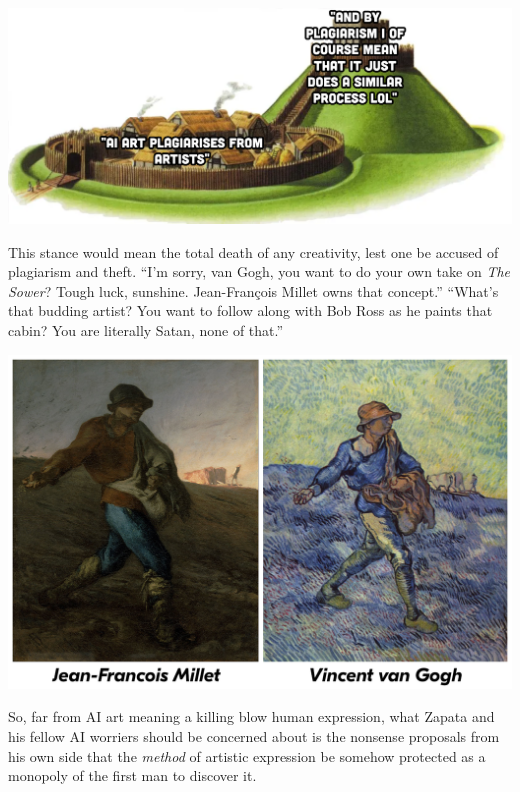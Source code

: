 \documentclass[11pt]{article}
\begin{document}
\begin{center}
\includegraphics[width=.9\linewidth]{./images/motte and bailey plagiarism.png}
\end{center}

This stance would mean the total death of any creativity, lest one be accused of plagiarism and theft. ``I'm sorry, van Gogh, you want to do your own take on \emph{The Sower}? Tough luck, sunshine. Jean-François Millet owns that concept.'' ``What's that budding artist? You want to follow along with Bob Ross as he paints that cabin? You are literally Satan, none of that.''

\begin{center}
\includegraphics[width=.9\linewidth]{./images/van gogh millet alt.png}
\end{center}

So, far from AI art meaning a killing blow human expression, what Zapata and his fellow AI worriers should be concerned about is the nonsense proposals from his own side that the \emph{method} of artistic expression be somehow protected as a monopoly of the first man to discover it.
\end{document}
